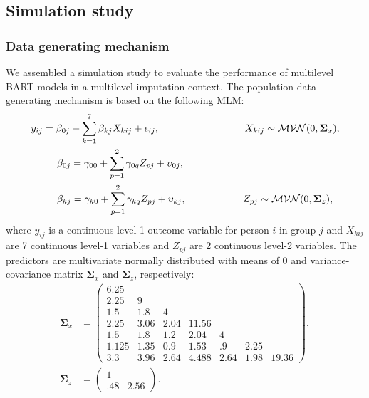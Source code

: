 \documentclass[10pt, a4paper, titlepage]{article}
\begin{document}
\subsection{Simulation study}
\subsubsection{Data generating mechanism}
We assembled a simulation study to evaluate the performance of multilevel BART models in a multilevel imputation context. The population data-generating mechanism is based on the following MLM:
\begin{subequations}
\label{eq:population}
\begin{align}
        y_{ij} &= \beta_{0j} + \sum_{k=1}^{7}\beta_{kj}X_{kij} + \epsilon_{ij}, \hspace{3cm} X_{kij} \sim \mathcal{MVN}(0, \boldsymbol{\Sigma}_{x}), \label{eq:population1} \\
        &\hspace{.5cm}\beta_{0j} = \gamma_{00} + \sum_{p=1}^{2}\gamma_{0q}Z_{pj} + \upsilon_{0j}, \label{eq:beta0}\\
        &\hspace{.5cm}\beta_{kj} = \gamma_{k0} + \sum_{p=1}^{2}\gamma_{kq}Z_{pj} + \upsilon_{kj}, \hspace{2cm} Z_{pj} \sim \mathcal{MVN}(0, \boldsymbol{\Sigma}_{z}), \label{eq:betak}
\end{align}
\end{subequations} where $y_{ij}$ is a continuous level-1 outcome variable for person $i$ in group $j$ and $X_{kij}$ are 7 continuous level-1 variables and $Z_{pj}$ are 2 continuous level-2 variables. The predictors are multivariate normally distributed with means of 0 and variance-covariance matrix $\boldsymbol{\Sigma}_{x}$ and $\boldsymbol{\Sigma}_{z}$, respectively:
\begin{subequations}
\begin{align}
    \boldsymbol{\Sigma}_{x} &= \begin{pmatrix}
        6.25& & & & & & \\
        2.25& 9& & & & & \\
        1.5& 1.8& 4& & & & \\
        2.25& 3.06& 2.04& 11.56& & & \\
        1.5& 1.8& 1.2& 2.04& 4& & \\
        1.125& 1.35& 0.9& 1.53& .9& 2.25& \\
        3.3& 3.96& 2.64& 4.488& 2.64& 1.98& 19.36
    \end{pmatrix}, \label{eq:sigma.x} \\
    \boldsymbol{\Sigma}_{z} &= \begin{pmatrix}
        1& \\
        .48& 2.56
    \end{pmatrix}. \label{eq:sigma.z}
\end{align}
\end{subequations}
\end{document}
